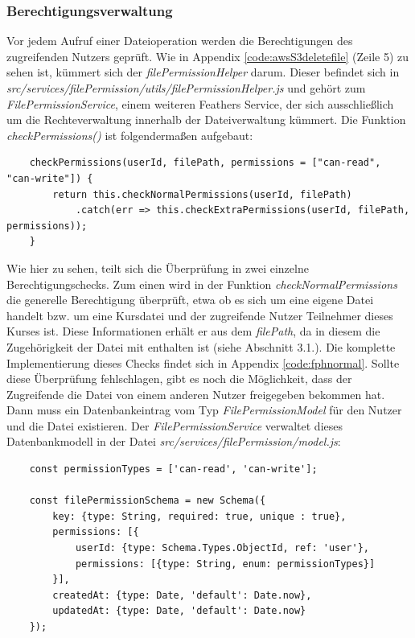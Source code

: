 \subsubsection{Berechtigungsverwaltung}

Vor jedem Aufruf einer Dateioperation werden die Berechtigungen des zugreifenden Nutzers geprüft. Wie in Appendix \ref{code:awsS3deletefile} (Zeile 5) zu sehen ist, kümmert sich der \textit{filePermissionHelper} darum. Dieser befindet sich in \textit{src/services/filePermission/utils/filePermissionHelper.js} und gehört zum \textit{FilePermissionService}, einem weiteren Feathers Service, der sich ausschließlich um die Rechteverwaltung innerhalb der Dateiverwaltung kümmert. Die Funktion \textit{checkPermissions()} ist folgendermaßen aufgebaut:

\begin{lstlisting}
	checkPermissions(userId, filePath, permissions = ["can-read", "can-write"]) {
		return this.checkNormalPermissions(userId, filePath)
			.catch(err => this.checkExtraPermissions(userId, filePath, permissions));
	}
\end{lstlisting}

Wie hier zu sehen, teilt sich die Überprüfung in zwei einzelne Berechtigungschecks. Zum einen wird in der Funktion \textit{checkNormalPermissions} die generelle Berechtigung überprüft, etwa ob es sich um eine eigene Datei handelt bzw. um eine Kursdatei und der zugreifende Nutzer Teilnehmer dieses Kurses ist. Diese Informationen erhält er aus dem \textit{filePath}, da in diesem die Zugehörigkeit der Datei mit enthalten ist (siehe Abschnitt 3.1.). Die komplette Implementierung dieses Checks findet sich in Appendix \ref{code:fphnormal}. Sollte diese Überprüfung fehlschlagen, gibt es noch die Möglichkeit, dass der Zugreifende die Datei von einem anderen Nutzer freigegeben bekommen hat. Dann muss ein Datenbankeintrag vom Typ \textit{FilePermissionModel} für den Nutzer und die Datei existieren. Der \textit{FilePermissionService} verwaltet dieses Datenbankmodell in der Datei \textit{src/services/filePermission/model.js}:

\begin{lstlisting}
	const permissionTypes = ['can-read', 'can-write'];
	
	const filePermissionSchema = new Schema({
		key: {type: String, required: true, unique : true},
		permissions: [{
			userId: {type: Schema.Types.ObjectId, ref: 'user'},
			permissions: [{type: String, enum: permissionTypes}]
		}],
		createdAt: {type: Date, 'default': Date.now},
		updatedAt: {type: Date, 'default': Date.now}
	});
\end{lstlisting}

